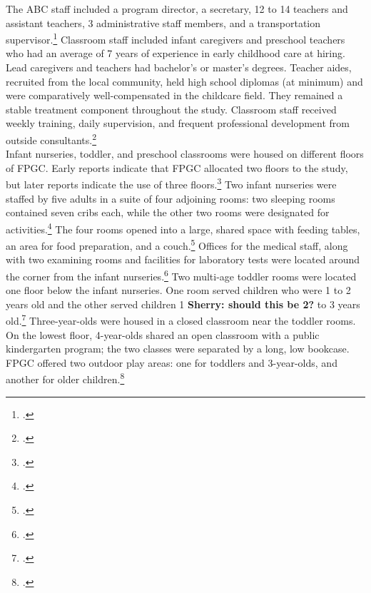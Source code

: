 \begin{appendices}
\noindent The ABC staff included a program director, a secretary, 12 to 14 teachers and assistant teachers, 3 administrative staff members, and a transportation supervisor.\footnote{\citet{Ramey-et-al_1977_Intro-to-ABC,Ramey_McGinness_etal_1982_Abecedarianapproach}.} Classroom staff included infant caregivers and preschool teachers who had an average of 7 years of experience in early childhood care at hiring. Lead caregivers and teachers had bachelor's or master's degrees. Teacher aides, recruited from the local community, held high school diplomas (at minimum) and were comparatively well-compensated in the childcare field. They remained a stable treatment component throughout the study. Classroom staff received weekly training, daily supervision, and frequent professional development from outside consultants.\footnote{\citet{Obrien-Sanders_1974_ABC-brochure,Sanders-Stokes_1979_Status-Report,Klein-Sanders_1982_Status-Report,abc2014-2015interviews}.}\\

\noindent Infant nurseries, toddler, and preschool classrooms were housed on different floors of FPGC. Early reports indicate that FPGC allocated two floors to the study, but later reports indicate the use of three floors.\footnote{\citet{Ramey_Smith_1977_AJMD,Ramey_Campbell_1979_SR,Ramey_1981_Modification}.} Two infant nurseries were staffed by five adults in a suite of four adjoining rooms: two sleeping rooms contained seven cribs each, while the other two rooms were designated for activities.\footnote{ \citet{Ramey-et-al_1977_Intro-to-ABC}.} The four rooms opened into a large, shared space with feeding tables, an area for food preparation, and a couch.\footnote{\citet{Ramey_Campbell_1979_SR}.} Offices for the medical staff, along with two examining rooms and facilities for laboratory tests were located around the corner from the infant nurseries.\footnote{\citet{abc2014-2015interviews}.} Two multi-age toddler rooms were located one floor below the infant nurseries. One room served children who were 1 to 2 years old and the other served children 1 \textbf{Sherry: should this be 2?} to 3 years old.\footnote{\citet{Ramey_Smith_1977_AJMD,Ramey_Campbell_1979_SR}.} Three-year-olds were housed in a closed classroom near the toddler rooms. On the lowest floor, 4-year-olds shared an open classroom with a public kindergarten program; the two classes were separated by a long, low bookcase. FPGC offered two outdoor play areas: one for toddlers and 3-year-olds, and another for older children.\footnote{\citet{Ramey_Campbell_1979_SR,Ramey_McGinness_etal_1982_Abecedarianapproach}.}\\


\end{appendices}
